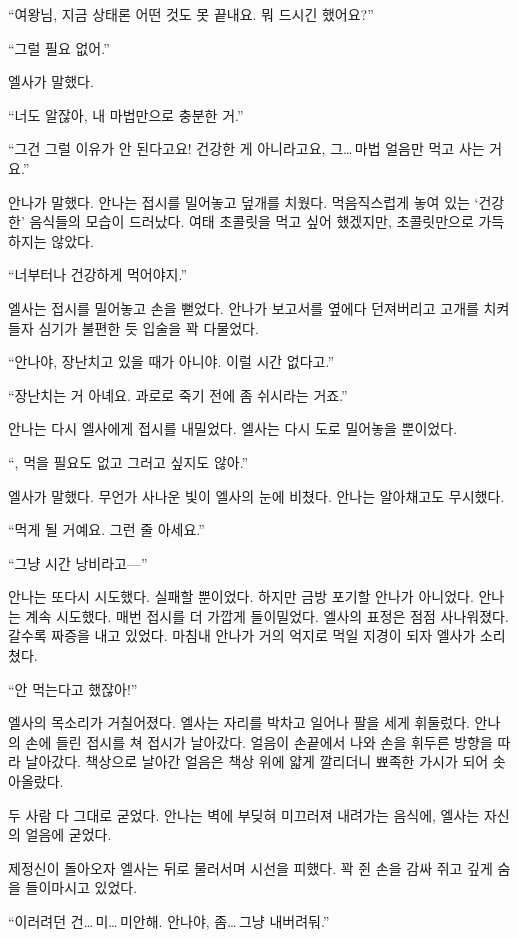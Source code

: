 ``여왕님, 지금 상태론 어떤 것도 못 끝내요. 뭐 드시긴 했어요?''

``그럴 필요 없어.''

엘사가 말했다.

``너도 알잖아, 내 마법만으로 충분한 거.''

``그건 그럴 이유가 안 된다고요! 건강한 게 아니라고요, 그\ldots\,마법 얼음만 먹고 사는 거요.''

안나가 말했다. 안나는 접시를 밀어놓고 덮개를 치웠다. 먹음직스럽게 놓여 있는 `건강한' 음식들의 모습이 드러났다. 여태 초콜릿을 먹고 싶어 했겠지만, 초콜릿만으로 가득하지는 않았다.

``너부터나 건강하게 먹어야지.''

엘사는 접시를 밀어놓고 손을 뻗었다. 안나가 보고서를 옆에다 던져버리고 고개를 치켜들자 심기가 불편한 듯 입술을 꽉 다물었다.

``안나야, 장난치고 있을 때가 아니야. 이럴 시간 없다고.''

``장난치는 거 아녜요. 과로로 죽기 전에 좀 쉬시라는 거죠.''

안나는 다시 엘사에게 접시를 내밀었다. 엘사는 다시 도로 밀어놓을 뿐이었다.

``, 먹을 필요도 없고 그러고 싶지도 않아.''

엘사가 말했다. 무언가 사나운 빛이 엘사의 눈에 비쳤다. 안나는 알아채고도 무시했다.

``먹게 될 거예요. 그런 줄 아세요.''

``그냥 시간 낭비라고—''

안나는 또다시 시도했다. 실패할 뿐이었다. 하지만 금방 포기할 안나가 아니었다. 안나는 계속 시도했다. 매번 접시를 더 가깝게 들이밀었다. 엘사의 표정은 점점 사나워졌다. 갈수록 짜증을 내고 있었다. 마침내 안나가 거의 억지로 먹일 지경이 되자 엘사가 소리쳤다.

``안 먹는다고 했잖아!''

엘사의 목소리가 거칠어졌다. 엘사는 자리를 박차고 일어나 팔을 세게 휘둘렀다. 안나의 손에 들린 접시를 쳐 접시가 날아갔다. 얼음이 손끝에서 나와 손을 휘두른 방향을 따라 날아갔다. 책상으로 날아간 얼음은 책상 위에 얇게 깔리더니 뾰족한 가시가 되어 솟아올랐다.

두 사람 다 그대로 굳었다. 안나는 벽에 부딪혀 미끄러져 내려가는 음식에, 엘사는 자신의 얼음에 굳었다.

제정신이 돌아오자 엘사는 뒤로 물러서며 시선을 피했다. 꽉 쥔 손을 감싸 쥐고 깊게 숨을 들이마시고 있었다.

``이러려던 건\ldots\,미\ldots\,미안해. 안나야, 좀\ldots\,그냥 내버려둬.''

